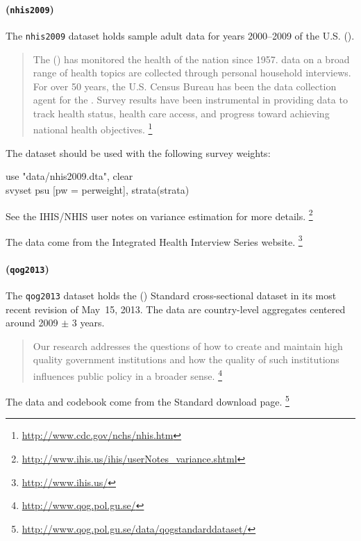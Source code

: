 \paragraph{\nhis (\texttt{nhis2009})}

The \texttt{nhis2009} dataset holds sample adult data for years 2000--2009 of the U.S. \nhis (\NHIS).

\begin{quote}
	The \nhis (\NHIS) has monitored the health of the nation since 1957. \NHIS data on a broad range of health topics are collected through personal household interviews. For over 50 years, the U.S. Census Bureau has been the data collection agent for the \NHIS. Survey results have been instrumental in providing data to track health status, health care access, and progress toward achieving national health objectives.%
	\footnote{\url{http://www.cdc.gov/nchs/nhis.htm}} 
\end{quote}

The \NHIS dataset should be used with the following survey weights:

\begin{docspec}
    use "data/nhis2009.dta", clear\\
    svyset psu [pw = perweight], strata(strata)
\end{docspec}

See the IHIS/NHIS user notes on variance estimation for more details.%
  \footnote{\url{http://www.ihis.us/ihis/userNotes_variance.shtml}}

The data come from the Integrated Health Interview Series website.%
  \footnote{\url{http://www.ihis.us/}}

\paragraph{\qog (\texttt{qog2013})}

The \texttt{qog2013} dataset holds the \qog (\QOG) Standard cross-sectional dataset in its most recent revision of May~15, 2013. The data are country-level aggregates centered around 2009 $\pm$ 3 years.%

\begin{quote}
	Our research addresses the questions of how to create and maintain high quality government institutions and how the quality of such institutions influences public policy in a broader sense.%
  \footnote{\url{http://www.qog.pol.gu.se/}}%
\end{quote}

The data and codebook come from the \QOG Standard download page.%
   \footnote{\url{http://www.qog.pol.gu.se/data/qogstandarddataset/}}

